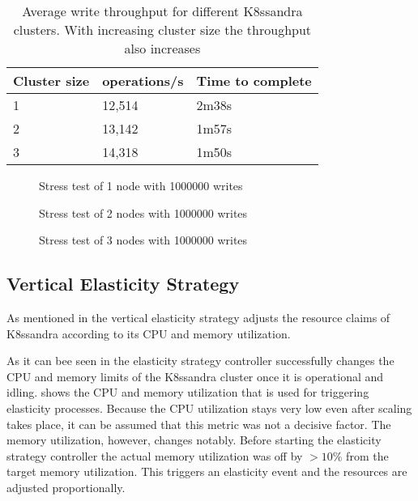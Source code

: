 \begin{table}[H]
\centering
\begin{tabular}{|l|l|l|}
\hline
\textbf{Cluster size} & \textbf{operations/s} & \textbf{Time to complete} \\ \hline
1                     & 12,514                 & 2m38s                     \\ \hline
2                     & 13,142                 & 1m57s                     \\ \hline
3                     & 14,318                 & 1m50s                     \\ \hline
\end{tabular}
\caption{Average write throughput for different K8ssandra clusters. With increasing cluster size the throughput also increases}
\label{tab:stress-1000000writes-ops}
\end{table}

\begin{figure}
    \centering
    
    \caption{Stress test of 1 node with 1000000 writes}
    \label{fig:stress-1000000writes-1node}
\end{figure}

\begin{figure}
    \centering
    
    \caption{Stress test of 2 nodes with 1000000 writes}
    \label{fig:stress-1000000writes-2node}
\end{figure}

\begin{figure}
    \centering
    
    \caption{Stress test of 3 nodes with 1000000 writes}
    \label{fig:stress-1000000writes-3node}
\end{figure}

\subsection{Vertical Elasticity Strategy}
\label{sec:evaluation-vertical-elasticity}

As mentioned in  the vertical elasticity strategy adjusts the resource claims of K8ssandra according to its CPU and memory utilization.

As it can bee seen in  the elasticity strategy controller successfully changes the CPU and memory limits of the K8ssandra cluster once it is operational and idling.  shows the CPU and memory utilization that is used for triggering elasticity processes. Because the CPU utilization stays very low even after scaling takes place, it can be assumed that this metric was not a decisive factor. The memory utilization, however, changes notably. Before starting the elasticity strategy controller the actual memory utilization was off by \(>10\%\) from the target memory utilization. This triggers an elasticity event and the resources are adjusted proportionally.

